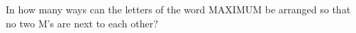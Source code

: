 In how many ways can the letters of the word MAXIMUM be arranged so that no two M's are next to each other?
